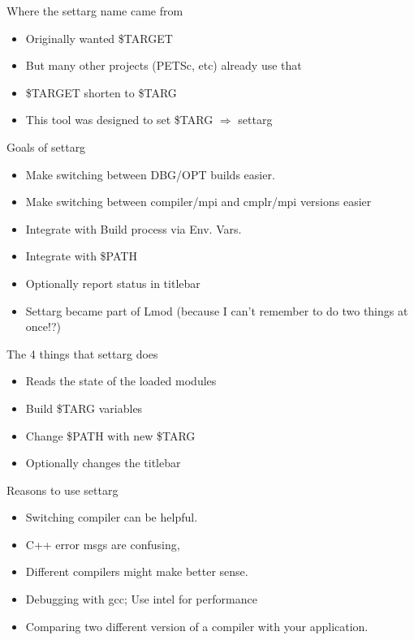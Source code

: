 \documentclass{beamer}
\begin{document}
\begin{frame}{Where the settarg name came from}
  \begin{itemize}
    \item Originally wanted \$TARGET
    \item But many other projects (PETSc, etc) already use that
    \item \$TARGET shorten to \$TARG
    \item This tool was designed to set \$TARG $\Rightarrow$ {\color{blue}settarg}
  \end{itemize}
\end{frame}

\begin{frame}{Goals of settarg}
  \begin{itemize}
    \item Make switching between DBG/OPT builds easier.
    \item Make switching between compiler/mpi and cmplr/mpi versions easier
    \item Integrate with Build process via Env. Vars.
    \item Integrate with \$PATH
    \item Optionally report status in titlebar
    \item Settarg became part of Lmod (because I can't remember to do
      two things at once!?)
  \end{itemize}
\end{frame}

\begin{frame}{The 4 things that settarg does}
  \begin{itemize}
    \item Reads the state of the loaded modules
    \item Build \$TARG variables
    \item Change \$PATH with new \$TARG
    \item Optionally changes the titlebar
  \end{itemize}
\end{frame}

\begin{frame}{Reasons to use settarg}
  \begin{itemize}
    \item Switching compiler can be helpful.
    \item C++ error msgs are confusing,
    \item Different compilers might make better sense.
    \item Debugging with gcc; Use intel for performance
    \item Comparing two different version of a compiler with your
      application.
  \end{itemize}
\end{frame}
\end{document}
